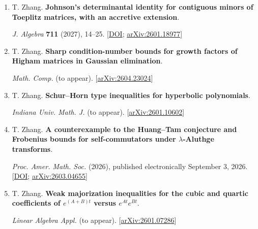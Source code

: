 \documentclass[11pt,letterpaper]{article}
\begin{document}
\begin{enumerate}[resume*=published]
\raggedright

\item \begin{minipage}[t]{\linewidth}\raggedright T. Zhang. \textbf{Johnson's determinantal identity for contiguous minors of Toeplitz matrices, with an accretive extension}.\par \textit{J. Algebra} \textbf{711} (2027), 14--25. [\href{https://doi.org/10.1016/j.jalgebra.2026.06.039}{DOI}; \href{https://arxiv.org/abs/2601.18977}{arXiv:2601.18977}]\end{minipage}

\item \begin{minipage}[t]{\linewidth}\raggedright T. Zhang. \textbf{Sharp condition-number bounds for growth factors of Higham matrices in Gaussian elimination}.\par \textit{Math. Comp.} (to appear). [\href{https://arxiv.org/abs/2604.23024}{arXiv:2604.23024}]\end{minipage}

\item \begin{minipage}[t]{\linewidth}\raggedright T. Zhang. \textbf{Schur--Horn type inequalities for hyperbolic polynomials}.\par \textit{Indiana Univ. Math. J.} (to appear). [\href{https://arxiv.org/abs/2601.10602}{arXiv:2601.10602}]\end{minipage}

\item \begin{minipage}[t]{\linewidth}\raggedright T. Zhang. \textbf{A counterexample to the Huang--Tam conjecture and Frobenius bounds for self-commutators under \(\lambda\)-Aluthge transforms}.\par \textit{Proc. Amer. Math. Soc.} (2026), published electronically September 3, 2026. [\href{https://doi.org/10.1090/proc/17896}{DOI}; \href{https://arxiv.org/abs/2603.04655}{arXiv:2603.04655}]\end{minipage}

\item \begin{minipage}[t]{\linewidth}\raggedright T. Zhang. \textbf{Weak majorization inequalities for the cubic and quartic coefficients of \(e^{(A+B)t}\) versus \(e^{At}e^{Bt}\)}.\par \textit{Linear Algebra Appl.} (to appear). [\href{https://arxiv.org/abs/2601.07286}{arXiv:2601.07286}]\end{minipage}


\end{enumerate}
\end{document}
